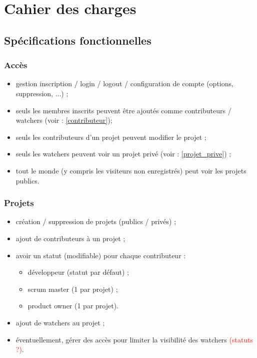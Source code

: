 \chapter{Cahier des charges}
\section{Sp\'ecifications fonctionnelles}

\subsection{Acc\`es}
\begin{itemize}
\item gestion inscription / login / logout / configuration de compte (options, suppression, ...) ;
\item seuls les membres inscrits peuvent \^etre ajout\'es comme contributeurs / watchers (voir : \ref{contributeur});
\item seuls les contributeurs d'un projet peuvent modifier le projet ;
\item seuls les watchers peuvent voir un projet priv\'e (voir : \ref{projet_prive}) ;
\item tout le monde (y compris les visiteurs non enregistr\'es) peut voir les projets publics.
\end{itemize}

\subsection{Projets}
\begin{itemize}
\item cr\'eation / suppression de projets (publics / priv\'es)\label{projet_prive} ;
\item ajout de contributeurs \`a un projet\label{contributeur} ;
\item avoir un statut (modifiable) pour chaque contributeur :
\begin{itemize}
\item d\'eveloppeur (statut par d\'efaut) ;
\item scrum master (1 par projet) ;
\item product owner (1 par projet).
\end{itemize}
\item ajout de \og{}watchers\fg{} au projet ;
\item \'eventuellement, g\'erer des acc\`es pour limiter la visibilit\'e des \og{}watchers\fg{} \textcolor{red}{(statuts ?)}.
\end{itemize}

